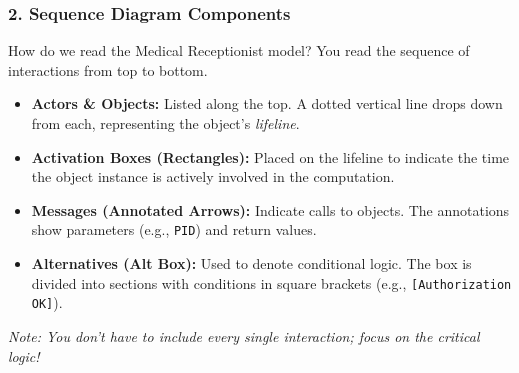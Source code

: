 \documentclass[xcolor=table]{beamer}
\begin{document}
\begin{frame}[fragile]
{
    }
\end{frame}

\begin{frame}
    \frametitle{2. Sequence Diagram Components}
    \small
    How do we read the Medical Receptionist model? You read the sequence of interactions from top to bottom.
    
    \vspace{0.3cm}
    \begin{itemize}
        \item \textbf{Actors \& Objects:} Listed along the top. A dotted vertical line drops down from each, representing the object's \textit{lifeline}.
        \item \textbf{Activation Boxes (Rectangles):} Placed on the lifeline to indicate the time the object instance is actively involved in the computation.
        \item \textbf{Messages (Annotated Arrows):} Indicate calls to objects. The annotations show parameters (e.g., \texttt{PID}) and return values.
        \item \textbf{Alternatives (Alt Box):} Used to denote conditional logic. The box is divided into sections with conditions in square brackets (e.g., \texttt{[Authorization OK]}).
    \end{itemize}
    \vspace{0.2cm}
    \textit{Note: You don't have to include every single interaction; focus on the critical logic!}
\end{frame}

\end{document}
